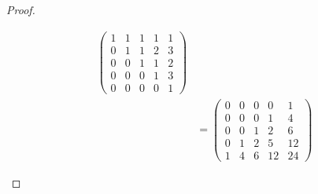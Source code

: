 \documentclass[12pt]{extarticle}
\newcommand{\<}{\langle}
\renewcommand{\>}{\rangle}
\theoremstyle{definition}
\begin{document}
\begin{proof}
\begin{enumerate}
\begin{align*}
\begin{pmatrix}
        1 & 1 & 1 & 1 & 1 \\
        0 & 1 & 1 & 2 & 3 \\
        0 & 0 & 1 & 1 & 2 \\
        0 & 0 & 0 & 1 & 3 \\
        0 & 0 & 0 & 0 & 1 
      \end{pmatrix} \\
      &=
      \begin{pmatrix}
        0 & 0 & 0 & 0 & 1 \\
        0 & 0 & 0 & 1 & 4 \\
        0 & 0 & 1 & 2 & 6 \\
        0 & 1 & 2 & 5 & 12 \\
        1 & 4 & 6 & 12 & 24
      \end{pmatrix}
    \end{align*}


\end{enumerate}
\end{proof}
\end{document}
